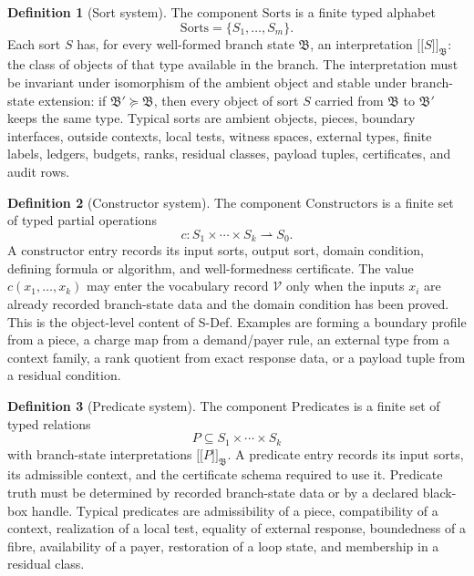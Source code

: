 \documentclass[
  11pt,
]{article}
\providecommand{\llbracket}{\mathopen{[\![}}
\providecommand{\rrbracket}{\mathclose{]\!]}}
\theoremstyle{definition}
\newtheorem{definition}{Definition}[section]
\begin{document}
\begin{definition}[Sort system]\label{def:proof-language-sorts}
The component \(\mathrm{Sorts}\) is a finite typed alphabet
\[
\mathrm{Sorts}=\{S_1,\ldots,S_m\}.
\]
Each sort \(S\) has, for every well-formed branch state
\(\mathfrak B\), an interpretation \(\llbracket S\rrbracket_{\mathfrak B}\):
the class of objects of that type available in the branch.  The
interpretation must be invariant under isomorphism of the ambient object
and stable under branch-state extension: if
\(\mathfrak B'\succeq\mathfrak B\), then every object of sort \(S\)
carried from \(\mathfrak B\) to \(\mathfrak B'\) keeps the same type.
Typical sorts are ambient objects, pieces, boundary interfaces, outside
contexts, local tests, witness spaces, external types, finite labels,
ledgers, budgets, ranks, residual classes, payload tuples, certificates,
and audit rows.
\end{definition}

\begin{definition}[Constructor system]\label{def:proof-language-constructors}
The component \(\mathrm{Constructors}\) is a finite set of typed partial
operations
\[
c:S_1\times\cdots\times S_k\rightharpoonup S_0.
\]
A constructor entry records its input sorts, output sort, domain
condition, defining formula or algorithm, and well-formedness
certificate.  The value \(c(x_1,\ldots,x_k)\) may enter the vocabulary
record \(\mathcal V\) only when the inputs \(x_i\) are already recorded
branch-state data and the domain condition has been proved.  This is the
object-level content of S-Def.  Examples are forming a boundary profile
from a piece, a charge map from a demand/payer rule, an external type
from a context family, a rank quotient from exact response data, or a
payload tuple from a residual condition.
\end{definition}

\begin{definition}[Predicate system]\label{def:proof-language-predicates}
The component \(\mathrm{Predicates}\) is a finite set of typed relations
\[
P\subseteq S_1\times\cdots\times S_k
\]
with branch-state interpretations
\(\llbracket P\rrbracket_{\mathfrak B}\).  A predicate entry records its
input sorts, its admissible context, and the certificate schema required
to use it.  Predicate truth must be determined by recorded branch-state
data or by a declared black-box handle.  Typical predicates are
admissibility of a piece, compatibility of a context, realization of a
local test, equality of external response, boundedness of a fibre,
availability of a payer, restoration of a loop state, and membership in
a residual class.
\end{definition}
\end{document}
